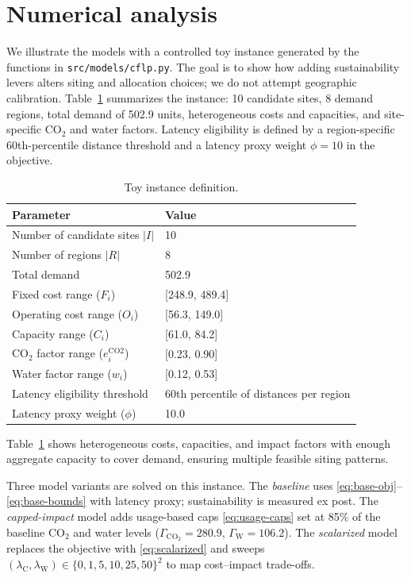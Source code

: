 \section{Numerical analysis}\label{sec:num}

We illustrate the models with a controlled toy instance generated by the functions in \texttt{src/models/cflp.py}. The goal is to show how adding sustainability levers alters siting and allocation choices; we do not attempt geographic calibration. Table~\ref{tab:instance} summarizes the instance: 10 candidate sites, 8 demand regions, total demand of 502.9 units, heterogeneous costs and capacities, and site-specific CO$_2$ and water factors. Latency eligibility is defined by a region-specific 60th-percentile distance threshold and a latency proxy weight $\phi=10$ in the objective.

\begin{table}[t]
  \centering
  \caption{Toy instance definition.}
  \label{tab:instance}
  \begin{tabular}{ll}
    \toprule
    Parameter & Value \\
    \midrule
    Number of candidate sites $|I|$ & 10 \\
    Number of regions $|R|$ & 8 \\
    Total demand & 502.9 \\
    Fixed cost range ($F_i$) & {[}248.9, 489.4{]} \\
    Operating cost range ($O_i$) & {[}56.3, 149.0{]} \\
    Capacity range ($C_i$) & {[}61.0, 84.2{]} \\
    CO$_2$ factor range ($e_i^{\mathrm{CO2}}$) & {[}0.23, 0.90{]} \\
    Water factor range ($w_i$) & {[}0.12, 0.53{]} \\
    Latency eligibility threshold & 60th percentile of distances per region \\
    Latency proxy weight ($\phi$) & 10.0 \\
    \bottomrule
  \end{tabular}
\end{table}
Table~\ref{tab:instance} shows heterogeneous costs, capacities, and impact factors with enough aggregate capacity to cover demand, ensuring multiple feasible siting patterns.

Three model variants are solved on this instance. The \emph{baseline} uses \eqref{eq:base-obj}--\eqref{eq:base-bounds} with latency proxy; sustainability is measured ex post. The \emph{capped-impact} model adds usage-based caps \eqref{eq:usage-caps} set at 85\% of the baseline CO$_2$ and water levels ($\Gamma_{\mathrm{CO_2}}=280.9$, $\Gamma_{\mathrm{W}}=106.2$). The \emph{scalarized} model replaces the objective with \eqref{eq:scalarized} and sweeps $(\lambda_{\mathrm{C}},\lambda_{\mathrm{W}})\in\{0,1,5,10,25,50\}^2$ to map cost–impact trade-offs.

